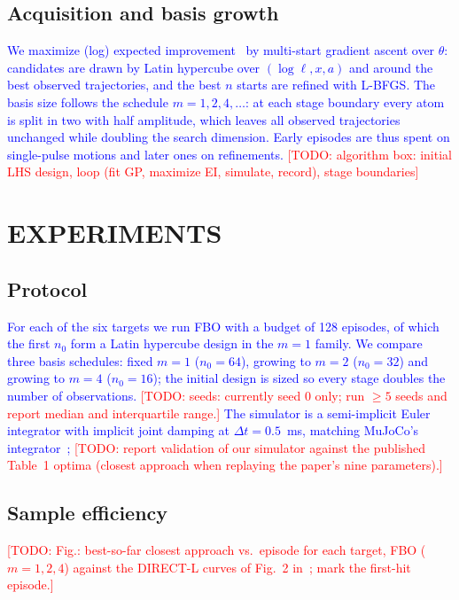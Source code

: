 \documentclass[letterpaper, 10 pt, conference]{ieeeconf}
\newcommand{\todo}[1]{\textcolor{red}{[TODO: #1]}}
\newcommand{\draft}[1]{\textcolor{blue}{#1}}
\begin{document}
\subsection{Acquisition and basis growth}
\draft{
We maximize (log) expected improvement~\cite{ament2023logei} by multi-start
gradient ascent over $\theta$: candidates are drawn by Latin hypercube over
$(\log\ell, x, a)$ and around the best observed trajectories, and the best
$n$ starts are refined with L-BFGS. The basis size follows the schedule
$m = 1, 2, 4, \dots$: at each stage boundary every atom is split in two with
half amplitude, which leaves all observed trajectories unchanged while doubling
the search dimension. Early episodes are thus spent on single-pulse motions and
later ones on refinements.
}
\todo{algorithm box: initial LHS design, loop (fit GP, maximize EI, simulate, record), stage boundaries}

\section{EXPERIMENTS}
\label{sec:experiments}

\subsection{Protocol}
\draft{
For each of the six targets we run FBO with a budget of 128 episodes, of which
the first $n_0$ form a Latin hypercube design in the $m=1$ family. We compare
three basis schedules: fixed $m=1$ ($n_0=64$), growing to $m=2$ ($n_0=32$) and
growing to $m=4$ ($n_0=16$); the initial design is sized so every stage
doubles the number of observations. \todo{seeds: currently seed 0 only; run
$\geq 5$ seeds and report median and interquartile range.} The simulator is a
semi-implicit Euler integrator with implicit joint damping at $\Delta t = 0.5$~ms,
matching MuJoCo's integrator~\cite{todorov2012mujoco}; \todo{report validation
of our simulator against the published Table~1 optima (closest approach when
replaying the paper's nine parameters).}
}

\subsection{Sample efficiency}
\todo{Fig.: best-so-far closest approach vs.\ episode for each target, FBO
($m=1,2,4$) against the DIRECT-L curves of Fig.~2 in~\cite{nah2023whip}; mark
the first-hit episode.}
\end{document}
